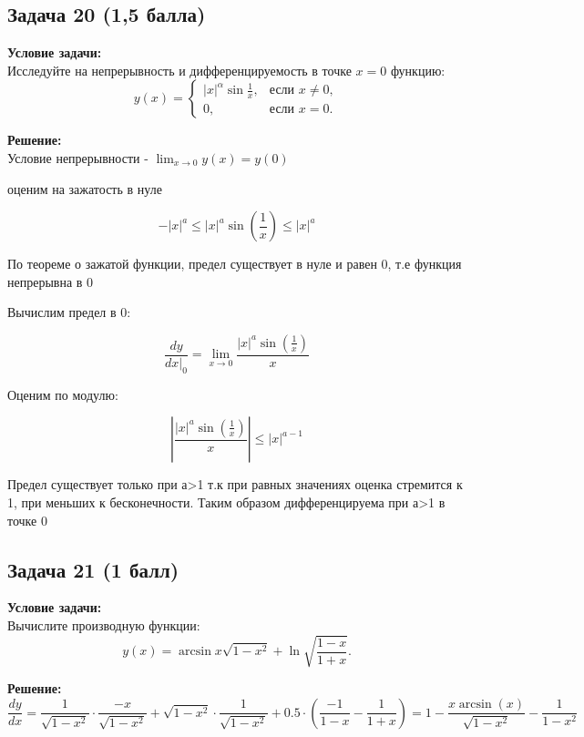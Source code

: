 \documentclass[a4paper,12pt]{article}
\begin{document}
\vspace{1cm}

\subsection{Задача 20 (1,5 балла)}
\textbf{Условие задачи:} \\
Исследуйте на непрерывность и дифференцируемость в точке \( x = 0 \) функцию:
\[
y(x) = \begin{cases}
|x|^\alpha \sin \frac{1}{x}, & \text{если } x \neq 0, \\
0, & \text{если } x = 0.
\end{cases}
\]

\textbf{Решение:} \\
Условие непрерывности - $\lim_{x \to 0}y(x)=y(0)$

оценим на зажатость в нуле

\[
-|x|^a \le |x|^a \sin(\frac{1}{x}) \le |x|^a
\]

По теореме о зажатой функции, предел существует в нуле и равен 0, т.е функция непрерывна в 0

Вычислим предел в 0: 

\[
\frac{dy}{dx|_0} = \lim_{x \to 0} \frac{|x|^a\sin(\frac{1}{x})}{x}
\]

Оценим по модулю:

\[
|\frac{|x|^a\sin(\frac{1}{x})}{x}| \le |x|^{a-1}
\]

Предел существует только при а>1 т.к при равных значениях оценка стремится к 1, при меньших к бесконечности. Таким образом дифференцируема при а>1 в точке 0

\vspace{1cm}

\subsection{Задача 21 (1 балл)}
\textbf{Условие задачи:} \\
Вычислите производную функции:
\[
y(x) = \arcsin x \sqrt{1 - x^2} + \ln \sqrt{\frac{1 - x}{1 + x}}.
\]

\textbf{Решение:} \\
\[
\frac{dy}{dx} = \frac{1}{\sqrt{1-x^2}}\cdot \frac{-x}{\sqrt{1-x^2}} + \sqrt{1-x^2}\cdot \frac{1}{\sqrt{1-x^2}} + 0.5 \cdot (\frac{-1}{1-x} - \frac{1}{1+x}) = 1 - \frac{x\arcsin(x)}{\sqrt{1-x^2}} - \frac{1}{1-x^2}
\]

\vspace{1cm}
\end{document}
